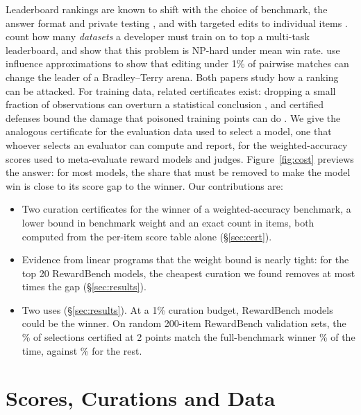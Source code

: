 \documentclass[11pt]{article}
\begin{document}
Leaderboard rankings are known to shift with the choice of benchmark, the answer format and private testing \citep{dehghani2021lottery,alzahrani2024targets,singh2025illusion,zhang2024tradeoffs}, and with targeted edits to individual items \citep{dubrovsky2025selective}. \citet{gordienko2026rig} count how many \emph{datasets} a developer must train on to top a multi-task leaderboard, and show that this problem is NP-hard under mean win rate. \citet{oyarhoseini2026perturbation} use influence approximations to show that editing under 1\% of pairwise matches can change the leader of a Bradley--Terry arena. Both papers study how a ranking can be attacked. For training data, related certificates exist: dropping a small fraction of observations can overturn a statistical conclusion \citep{broderick2020amip}, and certified defenses bound the damage that poisoned training points can do \citep{steinhardt2017certified}. We give the analogous certificate for the evaluation data used to select a model, one that whoever selects an evaluator can compute and report, for the weighted-accuracy scores used to meta-evaluate reward models and judges. Figure~\ref{fig:cost} previews the answer: for most models, the share that must be removed to make the model win is close to its score gap to the winner. Our contributions are:
\begin{itemize}\setlength\itemsep{0pt}
\item Two curation certificates for the winner of a weighted-accuracy benchmark, a lower bound in benchmark weight and an exact count in items, both computed from the per-item score table alone (\S\ref{sec:cert}).
\item Evidence from linear programs that the weight bound is nearly tight: for the top 20 RewardBench models, the cheapest curation we found removes at most \OneFreeRatioTopTwentyMax{} times the gap (\S\ref{sec:results}).
\item Two uses (\S\ref{sec:results}). At a 1\% curation budget, \OnePlausOneLo{} RewardBench models could be the winner. On random 200-item RewardBench validation sets, the \OneValTwoHundredCertShare\% of selections certified at 2 points match the full-benchmark winner \OneValTwoHundredCert\% of the time, against \OneValTwoHundredUncert\% for the rest.
\end{itemize}

\section{Scores, Curations and Data}
\end{document}

